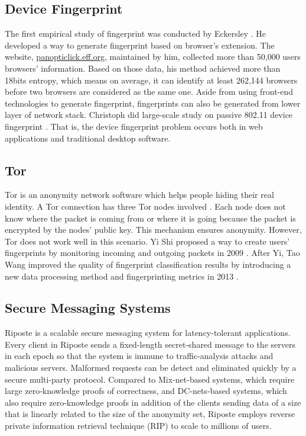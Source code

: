 \documentclass[twocolumn]{article}
\begin{document}
\subsection{Device Fingerprint}
The first empirical study of fingerprint was conducted by Eckersley \cite{eckersley2010unique}. He developed a way to generate fingerprint based on browser’s extension. The website, \url{panopticlick.eff.org}, maintained by him, collected more than 50,000 users browsers’ information. Based on those data, his method achieved more than 18bits entropy, which means on average, it can identify at least 262,144 browsers before two browsers are considered as the same one. Aside from using front-end technologies to generate fingerprint, fingerprints can also be generated from lower layer of network stack. Christoph did large-scale study on passive 802.11 device fingerprint \cite{neumann2012empirical}. That is, the device fingerprint problem occurs both in web applications and traditional desktop software.

\subsection{Tor}
Tor is an anonymity network software which helps people hiding their real identity. A Tor connection has three Tor nodes involved \cite{tororg}. Each node does not know where the packet is coming from or where it is going because the packet is encrypted by the nodes’ public key. This mechanism ensures anonymity. However, Tor does not work well in this scenario. Yi Shi proposed a way to create users' fingerprints by monitoring incoming and outgoing packets in 2009 \cite{shi2009fingerprinting}. After Yi, Tao Wang improved the quality of fingerprint classification results by introducing a new data processing method and fingerprinting metrics in 2013 \cite{wang2013improved}.

\subsection{Secure Messaging Systems}
Riposte \cite{corrigan-gibbs_riposte:_2015} is a scalable secure messaging system for latency-tolerant applications. Every client in Riposte sends a fixed-length secret-shared message to the servers in each epoch so that the system is immune to traffic-analysis attacks and malicious servers. Malformed requests can be detect and eliminated quickly by a secure multi-party protocol. Compared to Mix-net-based systems, which require large zero-knowledge proofs of correctness, and DC-nets-based systems, which also require zero-knowledge proofs in addition of the clients sending data of a size that is linearly related to the size of the anonymity set, Riposte employs reverse private information retrieval technique (RIP) to scale to millions of users.
\end{document}
